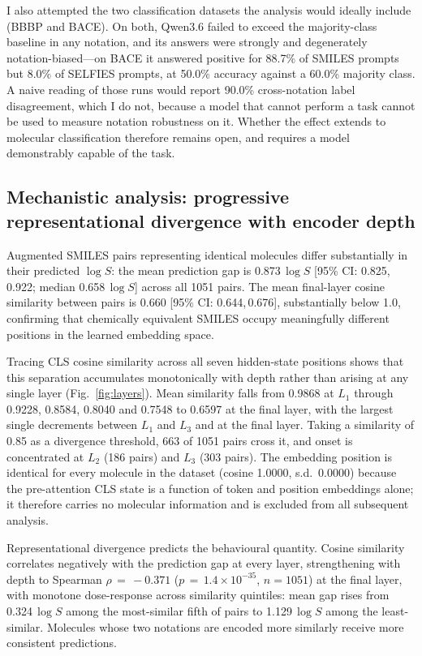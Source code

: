 \documentclass[twoside,twocolumn,9pt]{article}
\newcommand{\logS}{\ensuremath{\log S}}
\begin{document}
I also attempted the two classification datasets the analysis would ideally include (BBBP and BACE). On both, Qwen3.6 failed to exceed the majority-class baseline in any notation, and its answers were strongly and degenerately notation-biased---on BACE it answered positive for 88.7\% of SMILES prompts but 8.0\% of SELFIES prompts, at 50.0\% accuracy against a 60.0\% majority class. A naive reading of those runs would report 90.0\% cross-notation label disagreement, which I do not, because a model that cannot perform a task cannot be used to measure notation robustness on it. Whether the effect extends to molecular classification therefore remains open, and requires a model demonstrably capable of the task.

\subsection{Mechanistic analysis: progressive representational divergence with encoder depth}

Augmented SMILES pairs representing identical molecules differ substantially in their predicted $\logS$: the mean prediction gap is 0.873\,$\logS$ [95\% CI: 0.825,\,0.922; median 0.658\,$\logS$] across all 1051 pairs. The mean final-layer cosine similarity between pairs is 0.660 [95\% CI: 0.644,\,0.676], substantially below 1.0, confirming that chemically equivalent SMILES occupy meaningfully different positions in the learned embedding space.

Tracing CLS cosine similarity across all seven hidden-state positions shows that this separation accumulates monotonically with depth rather than arising at any single layer (Fig.~\ref{fig:layers}). Mean similarity falls from 0.9868 at $L_1$ through 0.9228, 0.8584, 0.8040 and 0.7548 to 0.6597 at the final layer, with the largest single decrements between $L_1$ and $L_3$ and at the final layer. Taking a similarity of 0.85 as a divergence threshold, 663 of 1051 pairs cross it, and onset is concentrated at $L_2$ (186 pairs) and $L_3$ (303 pairs). The embedding position is identical for every molecule in the dataset (cosine 1.0000, s.d.\ 0.0000) because the pre-attention CLS state is a function of token and position embeddings alone; it therefore carries no molecular information and is excluded from all subsequent analysis.

Representational divergence predicts the behavioural quantity. Cosine similarity correlates negatively with the prediction gap at every layer, strengthening with depth to Spearman $\rho\,=\,-0.371$ ($p\,=\,1.4\!\times\!10^{-35}$, $n=1051$) at the final layer, with monotone dose-response across similarity quintiles: mean gap rises from 0.324\,$\logS$ among the most-similar fifth of pairs to 1.129\,$\logS$ among the least-similar. Molecules whose two notations are encoded more similarly receive more consistent predictions.
\end{document}
